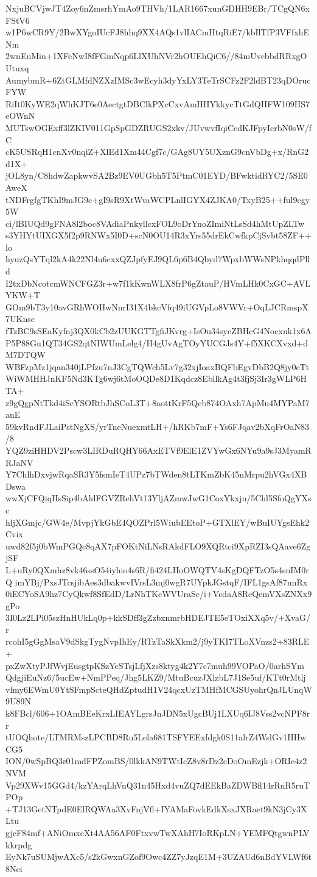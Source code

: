 NxjuBCVjwJT4Zoy6nZmsrhYmAo9THVh/1LAR1667xunGDHH9EBr/TCgQN6xFStV6
w1P6wCR9Y/2BwXYgoIUcFJ8hhq9XX4AQs1vlIACmHtqRiE7/kbIlTfP3VFfxhENm
2wnEuMin+1XFeNwI8fFGmNqp6LlXUhNVr2hOUEhQiC6//84mUvcbbdRRxgOUtuxq
AumybmR+6ZtGLMfdNZXzIMSc3wEcyh3dyYxLY3TeTrSCFz2F2ldBT23qDOrucFYW
RiIt0KyWE2qWhKJT6e0AectgtDBClkPXcCxvAmHHYkkycTtGdQHFW109HS7eOWnN
MUTswOGExff3lZKIV011GpSpGDZRUGS2xkv/JUvwvfIqiCedKJFpyIcrbN0sW/fC
cK5USRqH1cnXv0nqiZ+XlEd1Xm44Cgf7c/GAg8UY5UXznG9cnVbDg+x/RnG2d1X+
jOL8yn/C8hdwZapkwvSA2Bz9EV0UGbh5T5PtmC01EYD/BFwktidRYC2/5SE0AweX
tNDFrgfgTKhI9mJG9c+gI9sR9XtWvaWCPLnlIGYX4ZJKA0/TxyB25++ful9cgy5W
ci/lBIUQd9gFNA8l2boc8VAdiaPnkyllcxFOL9oDrYnoZImiNtLsSd4hMtUpZLTw
s3YHYtUIXGX5f2p9RNWx5I0D+scN0OU14R3xYrs55drEkCwfkpCjSvbt58ZF++lo
hyuzQsYTql2kA4k22Nl4u6cxxQZJpfyEJ9QL6p6B4Qbyd7WpxbWWsNPkhqqdPlld
I2txDbNcotcmWNCFGZ3r+w7f1kKwnWLX8frP6gZtauP/HVmLHk0CxGC+AVLYKW+T
GOm9bT3y10avGRhWOHwNnrI31X4bkcVfq49iUGVpLo8VWVr+OqLJCRmspX7UKnsc
fTzBC9sSEaKyfnj3QX0kCb2zUUKGTTgfiJKvrg+IsOu34sycZBHcG4Nocxnk1x6A
P5P88Gu1QT34GS2qtNIWUmLelg4/H4gUvAgTOyYUCGJs4Y+f5XKCXvxd+dM7DTQW
WBFzpMz1jqan340jLPfzu7nJ3CgTQWch5Lv7g32xjIoaxBQFbEgvDbB2Q8jy0cTt
WiWMHHJnKF5Nd3KTg6wj6tMoOQDe8D1Kqdcz8EbllkAg4t3fjSj3Ir3gWLP6HTA+
z9gQgpNtTkd4iScYSORtbJhSCoL3T+8aottKrF5Qcb874OAxh7ApMu4MYPaM7anE
59kvRndFJLaiPstNgXS/yrTneNuexmtLH+/hRKb7mF+Ys6FJqav2bXqFrOaN83/8
YQZ9ziHHDV2Pscw3LIRDuRQHY66AxETVf9ElE1ZVYwGx6NYu9a9sJ3MyamRRJaNV
Y7ChlhDxvjwRqaSR3Y5fsmIeT4UPz7bTWden8tLTKmZbK45nMrpu2hVGx4XBDswa
wwXjCFQiqHsSip4bAldFGVZRehVt13YljAZmwJwG1CoxYkxjn/5Chl5SfoQgYXsc
hljXGmjc/GW4e/MvpjYkGbE4QOZPrl5WiubEEtoP+GTXlEY/wBuIUYgsEhk2Cvix
uwd82f5j0bWmPGQc8qAX7pFOKtNiLNsRAkdFLO9XQRtci9XpRZI3sQAave6ZgjSF
L+uRy0QXmhz8vk46ssO54iyhio4s6R/fi424LHoOWQTV4sKgDQFTzO5s4snIM0rQ
imYBj/PxsJTcsjibAes3dbakwvIVrsL3mj0wgR7UYpkJGstqF/IFL1gsAf87nnRx
0iECYoSA9hz7CyQkwf8SfEdD/LrNhTKeWVUraSc/i+VcdaA8ReQemVXsZNXx9gPo
3I0Lz2LPi05szHnHUkLq0p+kkSDff3gZzbxnmrbHDEJTE5eTOxiXXq5v/+XvaG/r
rcohI5gGgMsaV9dSkgTygNvpIhEy/RTzTaSkXkm2/j9yTKI7TLoXVnzs2+83RLE+
pxZwXtyPJfWvjEusgtpKSzYcSTsjLfjXzs8ktyg4k2Y7c7muh99VOPaO/0arhSYm
QdgjiEuNz6/5ucEw+NmPPeq/Jhg5LKZ9/MtuBcuzJXlzbL7J1Se5uf/KTt0rMtlj
vlmy6EWmU0YtSFmpScteQHdZptudH1V24qcxUzTMHfMCGSUyohrQnJLUnqW9U89N
k8FBcl/606+1OAmBEeKrxLIEAYLgrsJnJDN5xUgcBUj1LXUq6IJ8Vss2vcNPF8rr
tUOQhote/LTMRMszLPCBD8Ru5Lela681TSFYEExfdgk0S11alrZ4WslGv1HHwCG5
ION/0wSpBQ3r01mdFPZomBS/0lkkAN9TWtIcZ8v8rDz2cDoOmEzjk+ORIc4z2NVM
Vp29XWv15GGd4/kzYArqLhVnQ31n45Hxd4vuZQ7dEEkBaZDWBfl14rRnR5ruTPOp
+TJ13GetNTpdE0ElRQWAa3XvFnjVfl+IYAMaFovkEdkXsxJXRaet9kN3jCy3XLtu
gjcF84mf+ANiOmxcXt4AA56AF0FtxvwTwXAhH7IoRKpLN+YEMFQtgwnPLVkkrpdg
EyNk7uSUMjwAXc5/s2kGwxnGZof9Owc4ZZ7yJzqE1M+3UZAUd6nBdYVLWf6t8Nci
